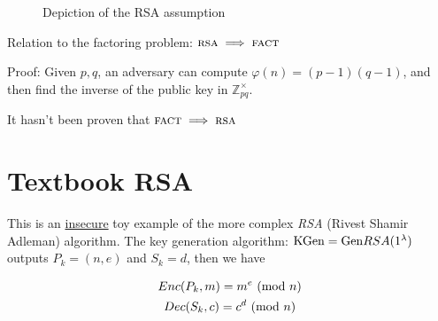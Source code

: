 \begin{figure}[h!]
   \centering
   \sdinit{}
   \caption{Depiction of the RSA assumption}
   \label{fig:game_pke-rsa}
\end{figure}

Relation to the factoring problem: $\textsc{rsa} \implies \textsc{fact}$

Proof: Given $p, q$, an adversary can compute $\varphi(n) = (p-1)(q-1)$, and then find the inverse of the public key in $\mathbb{Z}_{pq}^\times$.

It hasn't been proven that $\textsc{fact} \implies \textsc{rsa}$









\section{Textbook RSA}
This is an \underline{insecure} toy example of the more complex \textit{RSA} (Rivest Shamir Adleman) algorithm.
The key generation algorithm: $\mathrm{KGen}=\mathrm{Gen} RSA(1^{\lambda})$ outputs $P_k=(n,e)$ and $S_k=d$, then we have

\begin{gather*}
    Enc(P_k,m)=m^e\ (\mathrm{mod}\ n)\\
    Dec(S_k,c)=c^d\ (\mathrm{mod}\ n)
\end{gather*}


